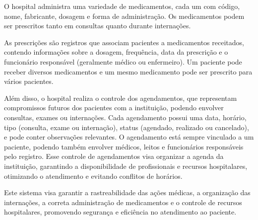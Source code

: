 \documentclass[a4paper,12pt]{article}
\begin{document}
O hospital administra uma variedade de medicamentos, cada um com código, nome, fabricante, dosagem e forma de administração. Os medicamentos podem ser prescritos tanto em consultas quanto durante internações.

As prescrições são registros que associam pacientes a medicamentos receitados, contendo informações sobre a dosagem, frequência, data da prescrição e o funcionário responsável (geralmente médico ou enfermeiro). Um paciente pode receber diversos medicamentos e um mesmo medicamento pode ser prescrito para vários pacientes.

Além disso, o hospital realiza o controle dos agendamentos, que representam compromissos futuros dos pacientes com a instituição, podendo envolver consultas, exames ou internações. Cada agendamento possui uma data, horário, tipo (consulta, exame ou internação), status (agendado, realizado ou cancelado), e pode conter observações relevantes. O agendamento está sempre vinculado a um paciente, podendo também envolver médicos, leitos e funcionários responsáveis pelo registro. Esse controle de agendamentos visa organizar a agenda da instituição, garantindo a disponibilidade de profissionais e recursos hospitalares, otimizando o atendimento e evitando conflitos de horários.

Este sistema visa garantir a rastreabilidade das ações médicas, a organização das internações, a correta administração de medicamentos e o controle de recursos hospitalares, promovendo segurança e eficiência no atendimento ao paciente.
\end{document}

